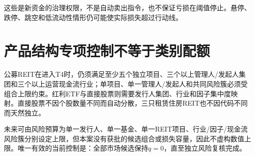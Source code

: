 这些是新资金的治理权限，不是自动卖出指令，也不保证亏损在阈值停止。悬停、跌停、跳空和低流动性情形仍可能使实际损失超过行动线。

\section{产品结构专项控制不等于类别配额}

公募REIT在进入T4时，仍须满足至少五个独立项目、三个以上管理人/发起人集团和三个以上运营现金流行业；单项目、单一管理人/发起人和共同风险簇必须受组合上限约束。红利ETF与直接股票则需要发行人集团、行业和因子集中度映射。直接股票不因个股数量不同而自动分散，三只租赁住房REIT也不因代码不同而天然独立。

未来可由风险预算为单一发行人、单一基金、单一REIT项目、行业/因子/现金流风险簇分别设定上限，但本案没有获批的候选组合或损失容量，因此不虚构数值上限。唯一有效的当前控制是：全部市场候选保持$q=0$，直至独立风险复核完成。

